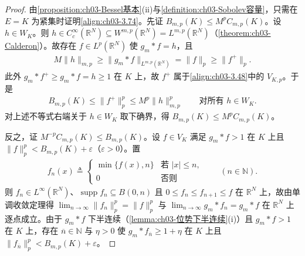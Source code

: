 \documentclass[../../main.tex]{subfiles}%
\begin{document}
\begin{proof}
由\cref{proposition:ch03-Bessel基本}(ii)与\cref{definition:ch03-Sobolev容量}，只需在 $E=K$ 为紧集时证明\eqref{align:ch03-3.74}。先证 $B_{m,p}(K)\leqslant M^pC_{m,p}(K)$。设 $h\in W_K$。则 $h\in C^\infty_c(\mathbb{R}^N)\subseteq W^{m,p}(\mathbb{R}^N)=L^{m,p}(\mathbb{R}^N)$（\cref{theorem:ch03-Calderon}）。故存在 $f\in L^p(\mathbb{R}^N)$ 使 $g_m*f=h$，且
\begin{align*}
M\|h\|_{m,p}\geqslant\|g_m*f\|_{L^{m,p}(\mathbb{R}^N)}=\|f\|_p\geqslant\|f^+\|_p.
\end{align*}
此外 $g_m*f^+\geqslant g_m*f=h\geqslant1$ 在 $K$ 上，故 $f^+$ 属于\eqref{align:ch03-3.48}中的 $V_{K,p}$。于是
\begin{align*}
B_{m,p}(K)\leqslant\|f^+\|_p^p\leqslant M^p\|h\|_{m,p}^p\qquad\text{对所有 }h\in W_K.
\end{align*}
对上述不等式右端关于 $h\in W_K$ 取下确界，得 $B_{m,p}(K)\leqslant M^pC_{m,p}(K)$。

反之，证 $M^{-p}C_{m,p}(K)\leqslant B_{m,p}(K)$。设 $f\in V_K$ 满足 $g_m*f>1$ 在 $K$ 上且 $\|f\|_p^p<B_{m,p}(K)+\varepsilon$（$\varepsilon>0$）。置
\begin{align*}
f_n(x)\triangleq \begin{cases}
\min\{f(x),n\} & \text{若 }|x|\leqslant n,\\
0 & \text{否则}
\end{cases}\qquad(n\in\mathbb{N}).
\end{align*}
则 $f_n\in L^\infty(\mathbb{R}^N)$、$\operatorname{supp}f_n\subseteq B(0,n)$ 且 $0\leqslant f_n\leqslant f_{n+1}\leqslant f$ 在 $\mathbb{R}^N$ 上，故由单调收敛定理得 $\lim_{n\to\infty}\|f_n\|_p^p=\|f\|_p^p$ 与 $\lim_{n\to\infty}g_m*f_n=g_m*f$ 在 $\mathbb{R}^N$ 上逐点成立。由于 $g_m*f$ 下半连续（\cref{lemma:ch03-位势下半连续}(i)）且 $g_m*f>1$ 在 $K$ 上，存在 $\overline n\in\mathbb{N}$ 与 $\eta>0$ 使 $g_m*f_{\overline n}\geqslant1+\eta$ 在 $K$ 上且 $\|f_{\overline n}\|_p^p<B_{m,p}(K)+\varepsilon$。


\end{proof}
\end{document}
